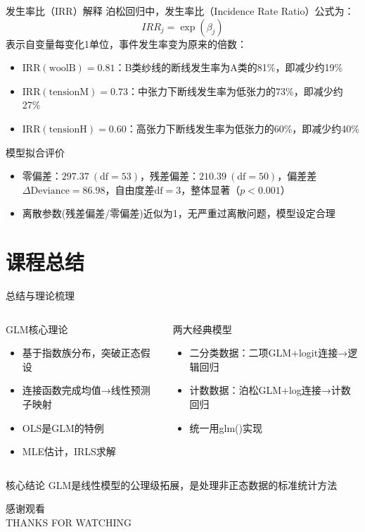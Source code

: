 \documentclass[aspectratio=169]{beamer}
\begin{document}
\begin{frame}
\begin{block}{发生率比（IRR）解释}
泊松回归中，发生率比（Incidence Rate Ratio）公式为：
\[ IRR_j = \exp(\beta_j) \]
表示自变量每变化1单位，事件发生率变为原来的倍数：
\begin{itemize}
\item $\text{IRR}(\text{woolB})=0.81$：B类纱线的断线发生率为A类的81\%，即减少约19\%
\item $\text{IRR}(\text{tensionM})=0.73$：中张力下断线发生率为低张力的73\%，即减少约27\%
\item $\text{IRR}(\text{tensionH})=0.60$：高张力下断线发生率为低张力的60\%，即减少约40\%
\end{itemize}
\end{block}

\begin{block}{模型拟合评价}
\begin{itemize}
\item 零偏差：$297.37\ (\text{df}=53)$，残差偏差：$210.39\ (\text{df}=50)$，偏差差 $\Delta\text{Deviance}=86.98$，自由度差$\text{df}=3$，整体显著（$p<0.001$）

\item 离散参数(残差偏差/零偏差)近似为1，无严重过离散问题，模型设定合理
\end{itemize}
\end{block}
\end{frame}


\section{课程总结}

\begin{frame}{总结与理论梳理}
\begin{columns}[T]
\begin{block}{GLM核心理论}
\begin{itemize}
\item 基于指数族分布，突破正态假设
\item 连接函数完成均值→线性预测子映射
\item OLS是GLM的特例
\item MLE估计，IRLS求解
\end{itemize}
\end{block}
\begin{block}{两大经典模型}
\begin{itemize}
\item 二分类数据：二项GLM+logit连接→逻辑回归
\item 计数数据：泊松GLM+log连接→计数回归
\item 统一用glm()实现
\end{itemize}
\end{block}
\end{columns}
\begin{block}{核心结论}
GLM是线性模型的公理级拓展，是处理非正态数据的标准统计方法
\end{block}
\end{frame}

\begin{frame}
\centering
\Huge \textcolor{mycolor}{感谢观看} \\
\vspace{0.3cm}
\Large THANKS FOR WATCHING
\end{frame}
\end{document}

